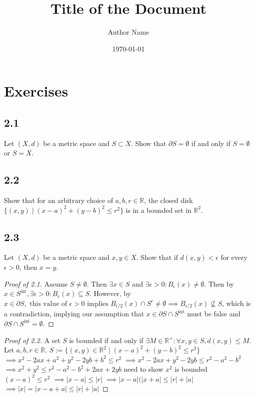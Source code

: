 \documentclass{article}
\title{\textbf{Title of the Document}}
\author{Author Name}
\date{\today}
\theoremstyle{definition}
\numberwithin{equation}{section}
\begin{document}
\maketitle
\tableofcontents
\newpage
\section{Exercises}
\subsection*{2.1}
Let $(X,d)$ be a metric space and $S \subset X$. Show that $\partial S = \emptyset$ if and only if $S = \emptyset$ or $S = X$.

\subsection*{2.2}
Show that for an arbitrary choice of $a,b,r \in \mathbb{R}$, the closed disk $\{(x,y) \mid (x-a)^2 + (y-b)^2 \leq r^2\}$ is in a bounded set in $\mathbb{R}^2$.

\subsection*{2.3}
Let $(X,d)$ be a metric space and $x,y \in X$. Show that if $d(x,y) < \epsilon$ for every $\epsilon > 0$, then $x = y$.

\begin{proof}[Proof of 2.1]
Assume $S \neq \emptyset$. Then $\exists x \in S$ and $\exists \epsilon > 0: B_\epsilon (x) \neq \emptyset$.
Then by $x \in S^{\text{int}}, \exists \epsilon > 0: B_\epsilon (x) \subseteq S$.
However, by $x \in \partial S, \text{ this value of } \epsilon > 0 \text{ implies } B_{\epsilon / 2}(x) \cap S^c \ne \emptyset \implies B_{\epsilon / 2}(x) \nsubseteq S$, which is a contradiction, implying our assumption that $x \in \partial S \cap S^{\text{int}}$ must be false and $\partial S \cap S^{\text{int}} = \emptyset$. 
\end{proof}

\begin{proof}[Proof of 2.2]
A set $S$ is bounded if and only if $\exists M \in \mathbb{R}^+ : \forall x, y \in S, d(x,y) \leq M$. Let $a,b,r \in \mathbb{R}$.
$
S := \{(x,y) \in \mathbb{R}^2 \mid (x-a)^2 + (y-b)^2 \leq r^2 \} 
$
$
\implies x^2 - 2ax + a^2 + y^2 - 2yb + b^2 \leq r^2
$
$
\implies x^2 - 2ax + y^2 - 2yb \leq r^2 - a^2 - b^2 
$
$
\implies x^2 + y^2 \leq r^2 - a^2 - b^2 + 2ax + 2yb
$
need to show $x^2$ is bounded
$
(x-a)^2 \leq r^2
$
$
\implies |x - a| \leq |r| 
$
$
\implies |x-a|(|x+a| \leq |r| + |a| 
$
$
\implies |x| = |x - a + a| \leq |r| + |a| 
$
\end{proof}
\end{document}
